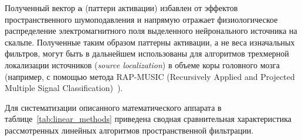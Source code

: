 Полученный вектор $\mathbf{a}$ (паттерн активации) избавлен от эффектов пространственного шумоподавления и напрямую отражает физиологическое распределение электромагнитного поля выделенного нейронального источника на скальпе. Полученные таким образом паттерны активации, а не веса изначальных фильтров, могут быть в дальнейшем использованы для алгоритмов трехмерной локализации источников (\textit{source localization}) в объеме коры головного мозга (например, с помощью метода RAP-MUSIC (Recursively Applied and Projected Multiple Signal Classification)~\cite{Mosher1998RecursiveMUSIC}). 

Для систематизации описанного математического аппарата в таблице~\ref{tab:linear_methods} приведена сводная сравнительная характеристика рассмотренных линейных алгоритмов пространственной фильтрации.

